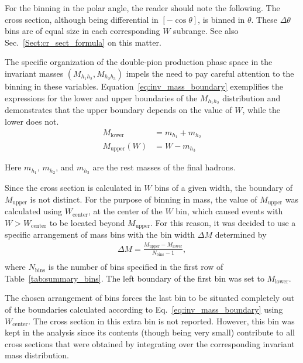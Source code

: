 \documentclass[prc,twocolumn,superscriptaddress,showpacs,amssymb,amsmath,amsfonts,aps,nofootinbib]{revtex4-1}
\begin{document}
For the binning in the polar angle, the reader should note the following. The cross section, although being differential in $[-\cos\theta]$, is binned in $\theta$. These $\Delta \theta$ bins are of equal size in each corresponding $W$ subrange. See also Sec.\!~\ref{Sect:cr_sect_formula} on this matter.




The specific organization of the double-pion production phase space in the invariant masses $(M_{h_{1}h_{2}}, M_{h_{2}h_{3}})$ impels the need to pay careful attention to the binning in these variables. Equation~\eqref{eq:inv_mass_boundary} exemplifies the expressions for the lower and upper boundaries of the $M_{h_{1}h_{2}}$ distribution and demonstrates that the upper boundary depends on the value of $W$, while the lower does not.
\begin{equation}
\begin{aligned}
M_{\text{lower}} &= m_{h_1} + m_{h_2} \\
M_{\text{upper}} (W) &= W - m_{h_3} \label{eq:inv_mass_boundary}
\end{aligned}  
\end{equation}

Here $m_{h_1}$, $m_{h_2}$, and $m_{h_3}$ are the rest masses of the final hadrons. 


Since the cross section is calculated in $W$ bins of a given width, the boundary of $M_{\text{upper}}$ is not distinct. For the purpose of binning in mass, the value of $M_{\text{upper}}$ was calculated using $W_{\text{center}}$, at the center of the $W$ bin, which caused events with $W > W_{\text{center}}$ to be located beyond $M_{\text{upper}}$. For this reason, it was decided to use a specific arrangement of mass bins with the bin width $\Delta M$ determined by
\begin{equation}
\begin{aligned}
\Delta M = \frac{M_{\text{upper}}-M_{\text{lower}}}{N_{\text{bins}}-1}, \\[-10pt]\label{eq:bin_width}
\end{aligned}  
\end{equation} 
where $N_{\text{bins}}$ is the number of bins specified in the first row of Table~\ref{tab:summary_bins}. The left boundary of the first bin was set to $M_{\text{lower}}$.

The chosen arrangement of bins forces the last bin to be situated completely out of the boundaries calculated according to Eq.\!~\eqref{eq:inv_mass_boundary} using $W_{\text{center}}$. The cross section in this extra bin is not reported. However, this bin was kept in the analysis since its contents (though being very small) contribute to all cross sections that were obtained by integrating over the corresponding invariant mass distribution. 
\end{document}

